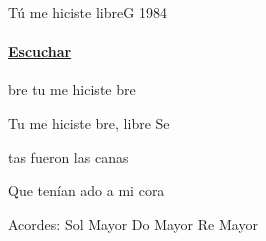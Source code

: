 \documentclass[12pt, spanish]{book}
\begin{document}
    \begin{song}{Tú me hiciste libre}{G}
        {1984} %
        {}
        {} %
        {}
        \ifChordBk
        \paragraph{\mbox{}\hfill\protect\href{https://open.spotify.com/intl-es/track/659td3cm4QUQfC08Kmfbwu}{Escuchar}\mbox{}\hfill}
        \fi



        \begin{SBOpGroup}
            bre tu me hiciste bre

            Tu me hiciste bre, libre Se

            tas fueron las canas

            Que tenían ado a mi cora
        \end{SBOpGroup}

        \ifChordBk
        \begin{SBOpGroup}
            Acordes:
            \upchord{\G}\qquad Sol Mayor \hfill
            \upchord{\C}\qquad Do Mayor \hfill\null\break
            \upchord{\D}\qquad Re Mayor \hfill
        \end{SBOpGroup}
        \fi
    \end{song}
\end{document}
